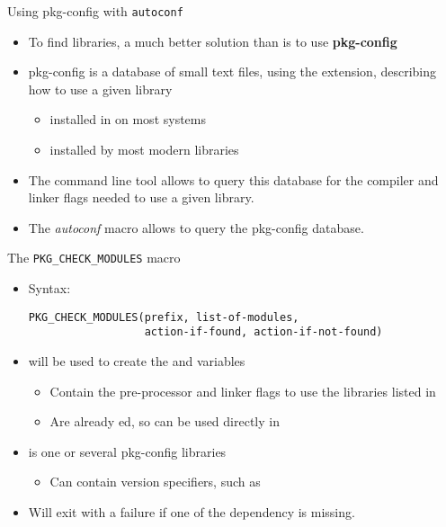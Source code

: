 \begin{frame}{Using pkg-config with {\tt autoconf}}

  \begin{itemize}

  \item To find libraries, a much better solution than
     is to use {\bf pkg-config}

  \item pkg-config is a database of small text files, using the
     extension, describing how to use a given library
    \begin{itemize}
    \item installed in  on most systems
    \item installed by most modern libraries
    \end{itemize}

  \item The  command line tool allows to query this
    database for the compiler and linker flags needed to use a given
    library.

  \item The  {\em autoconf} macro allows to
    query the pkg-config database.

  \end{itemize}

\end{frame}

\begin{frame}[fragile]{The {\tt PKG\_CHECK\_MODULES} macro}
\begin{itemize}
\item Syntax:
  \begin{block}{}
\begin{verbatim}
PKG_CHECK_MODULES(prefix, list-of-modules,
                  action-if-found, action-if-not-found)
\end{verbatim}
  \end{block}
\item {} will be used to create the
   and  variables
  \begin{itemize}
  \item Contain the pre-processor and linker flags to use the
    libraries listed in 
  \item Are already ed, so can be used directly in
  \end{itemize}
\item {} is one or several pkg-config libraries
  \begin{itemize}
  \item Can contain version specifiers, such as 
  \end{itemize}
\item Will exit with a failure if one of the dependency is missing.
\end{itemize}
\end{frame}

